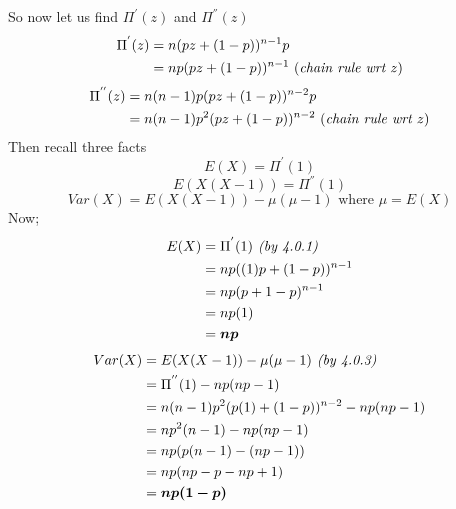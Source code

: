 \documentclass[11pt]{article}
\begin{document}
\noindent So now let us find $\Pi^{'}(z)$ and $\Pi^{''}(z)$
\begin{align*}
    \Pi^{'}(z) &= n(pz+(1-p))^{n-1}p \\
               &= np(pz+(1-p))^{n-1} \text{ (\emph{chain rule wrt $z$})}
\end{align*}
\begin{align*}
    \Pi^{''}(z) &= n(n-1)p(pz+(1-p))^{n-2}p \\
               &= n(n-1)p^{2}(pz+(1-p))^{n-2} \text{ (\emph{chain rule wrt $z$})}
\end{align*}
Then recall three facts
\begin{equation}
    \boxed{E(X)=\Pi^{'}(1)}
\end{equation}
\begin{equation}
    \boxed{E(X(X-1))=\Pi^{''}(1)}
\end{equation}
\begin{equation}
    \boxed{Var(X)=E(X(X-1))-\mu(\mu-1) \text{ where } \mu = E(X)}
\end{equation}
Now;
\begin{align*}
    E(X)&=\Pi^{'}(1)  \text{\emph{ (by 4.0.1)}}\\
        &=np((1)p+(1-p))^{n-1} \\
        &=np(p+1-p)^{n-1}\\
        &=np(1)\\
        &= \bm{np}
\end{align*}
\begin{align*}
    Var(X) &= E(X(X-1)) - \mu(\mu -1)  \text{\emph{ (by 4.0.3)}} \\
           &= \Pi^{''}(1) - np(np-1) \\
           &= n(n-1)p^{2}(p(1)+(1-p))^{n-2} - np(np-1) \\
           &= np^{2}(n-1) - np(np-1) \\
           &= np(p(n-1)-(np-1)) \\
           &= np(np-p-np+1)\\
           &= \bm{np(1-p)}
\end{align*}
\end{document}
